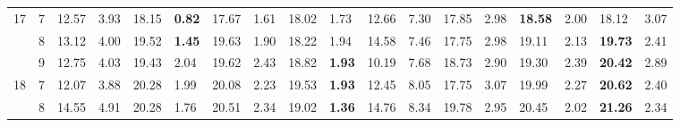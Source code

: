 \documentclass[conference]{IEEEtran}
\begin{document}
\begin{table}[]
\begin{tabular}{|cl|ll|ll|ll|ll|ll|ll|ll|ll|}
		\multicolumn{1}{|c|}{\multirow{3}{*}{17}} & 7          & \multicolumn{1}{l|}{12.57}         & 3.93          & \multicolumn{1}{l|}{18.15}          & \textbf{0.82} & \multicolumn{1}{l|}{17.67}          & 1.61          & \multicolumn{1}{l|}{18.02}          & 1.73          & \multicolumn{1}{l|}{12.66}                & 7.30  & \multicolumn{1}{l|}{17.85} & 2.98 & \multicolumn{1}{l|}{\textbf{18.58}} & 2.00          & \multicolumn{1}{l|}{18.12}          & 3.07          \\ \cline{2-18} 
		\multicolumn{1}{|c|}{}                    & 8          & \multicolumn{1}{l|}{13.12}         & 4.00          & \multicolumn{1}{l|}{19.52}          & \textbf{1.45} & \multicolumn{1}{l|}{19.63}          & 1.90          & \multicolumn{1}{l|}{18.22}          & 1.94          & \multicolumn{1}{l|}{14.58}                & 7.46  & \multicolumn{1}{l|}{17.75} & 2.98 & \multicolumn{1}{l|}{19.11}          & 2.13          & \multicolumn{1}{l|}{\textbf{19.73}} & 2.41          \\ \cline{2-18} 
		\multicolumn{1}{|c|}{}                    & 9          & \multicolumn{1}{l|}{12.75}         & 4.03          & \multicolumn{1}{l|}{19.43}          & 2.04          & \multicolumn{1}{l|}{19.62}          & 2.43          & \multicolumn{1}{l|}{18.82}          & \textbf{1.93} & \multicolumn{1}{l|}{10.19}                & 7.68  & \multicolumn{1}{l|}{18.73} & 2.90 & \multicolumn{1}{l|}{19.30}          & 2.39          & \multicolumn{1}{l|}{\textbf{20.42}} & 2.89          \\ \hline
		\multicolumn{1}{|c|}{\multirow{3}{*}{18}} & 7          & \multicolumn{1}{l|}{12.07}         & 3.88          & \multicolumn{1}{l|}{20.28}          & 1.99          & \multicolumn{1}{l|}{20.08}          & 2.23          & \multicolumn{1}{l|}{19.53}          & \textbf{1.93} & \multicolumn{1}{l|}{12.45}                & 8.05  & \multicolumn{1}{l|}{17.75} & 3.07 & \multicolumn{1}{l|}{19.99}          & 2.27          & \multicolumn{1}{l|}{\textbf{20.62}} & 2.40          \\ \cline{2-18} 
		\multicolumn{1}{|c|}{}                    & 8          & \multicolumn{1}{l|}{14.55}         & 4.91          & \multicolumn{1}{l|}{20.28}          & 1.76          & \multicolumn{1}{l|}{20.51}          & 2.34          & \multicolumn{1}{l|}{19.02}          & \textbf{1.36} & \multicolumn{1}{l|}{14.76}                & 8.34  & \multicolumn{1}{l|}{19.78} & 2.95 & \multicolumn{1}{l|}{20.45}          & 2.02          & \multicolumn{1}{l|}{\textbf{21.26}} & 2.34          \\ \cline{2-18} 

\end{tabular}
\end{table}
\end{document}
